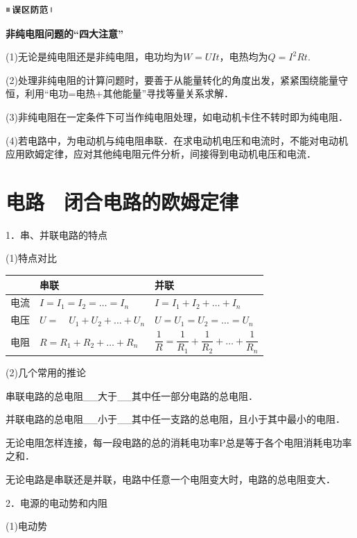 \begin{center}\includegraphics[width=0.70764in,height=0.12292in]{media/image34.png}\end{center}
\begin{center}
	\textbf{非纯电阻问题的``四大注意''}
\end{center}



(1)无论是纯电阻还是非纯电阻，电功均为$W=UIt$，电热均为$Q=I^2Rt$.

(2)处理非纯电阻的计算问题时，要善于从能量转化的角度出发，紧紧围绕能量守恒，利用``电功=电热+其他能量''寻找等量关系求解．

(3)非纯电阻在一定条件下可当作纯电阻处理，如电动机卡住不转时即为纯电阻．

(4)若电路中，为电动机与纯电阻串联．在求电动机电压和电流时，不能对电动机应用欧姆定律，应对其他纯电阻元件分析，间接得到电动机电压和电流．

\newpage
\section{电路　闭合电路的欧姆定律}

1．串、并联电路的特点

(1)特点对比

\begin{longtable}[]{@{}m{1cm}m{6cm}m{6cm}@{}}
\toprule
& 串联 & 并联\tabularnewline
\midrule
\endhead
电流 & $I=I_{1}=I_{2}=\ldots=I_{n}$ &
$I=I_{1}+I_{2}+\ldots+I_{n}$\tabularnewline
电压 & $U=\quad U_{1}+U_{2}+\ldots+U_{n}$ &
$U=U_{1}=U_{2}=\ldots=U_{n}$\tabularnewline
电阻 & $R=R_{1}+R_{2}+\ldots+R_{n}$ &
$\dfrac{1}{R}=\dfrac{1}{R_{1}}+\dfrac{1}{R_{2}}+\ldots+\dfrac{1}{R_{n}}$\tabularnewline
\bottomrule
\end{longtable}

(2)几个常用的推论

串联电路的总电阻\_\_大于\_\_其中任一部分电路的总电阻．

并联电路的总电阻\_\_小于\_\_其中任一支路的总电阻，且小于其中最小的电阻．

无论电阻怎样连接，每一段电路的总的消耗电功率P总是等于各个电阻消耗电功率之和．

无论电路是串联还是并联，电路中任意一个电阻变大时，电路的总电阻变大．

2．电源的电动势和内阻

(1)电动势

